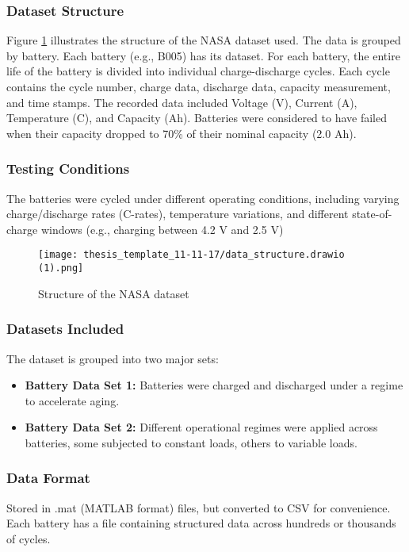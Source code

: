 \subsubsection{Dataset Structure}
Figure \ref{fig:data-structure} illustrates the structure of the NASA dataset used. The data is grouped by battery. Each battery (e.g., B005) has its dataset. For each battery, the entire life of the battery is divided into individual charge-discharge cycles. Each cycle contains the cycle number, charge data, discharge data, capacity measurement, and time stamps. The recorded data included Voltage (V), Current (A), Temperature (\degree C), and Capacity (Ah). Batteries were considered to have failed when their capacity dropped to 70\% of their nominal capacity (2.0 Ah).

\subsubsection{Testing Conditions}
The batteries were cycled under different operating conditions, including varying charge/discharge rates (C-rates), temperature variations, and different state-of-charge windows (e.g., charging between 4.2 V and 2.5 V)

\begin{figure}
    \centering
    \texttt{[image: thesis\_template\_11-11-17/data\_structure.drawio (1).png]}
    \caption{Structure of the NASA dataset}
    \label{fig:data-structure}
\end{figure}

\subsubsection{Datasets Included}
The dataset is grouped into two major sets:
\begin{itemize}
    \item \textbf{Battery Data Set 1:} Batteries were charged and discharged under a regime to accelerate aging.
    \item \textbf{Battery Data Set 2:} Different operational regimes were applied across batteries, some subjected to constant loads, others to variable loads.
\end{itemize}

\subsubsection{Data Format}
Stored in .mat (MATLAB format) files, but converted to CSV for convenience. Each battery has a file containing structured data across hundreds or thousands of cycles.

